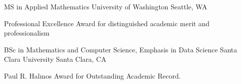 
\begin{cventries}

  \cventry
    {MS in Applied Mathematics} %
    {University of Washington} %
    {Seattle, WA} %
    {} %
    {
      \begin{cvitems} %
        \item {Professional Excellence Award for distinguished academic merit and professionalism}
      \end{cvitems}
    }

  \cventry
    {BSc in Mathematics and Computer Science, Emphasis in Data Science} %
    {Santa Clara University} %
    {Santa Clara, CA} %
    {} %
    {
      \begin{cvitems} %
        \item {Paul R. Halmos Award for Outstanding Academic Record.}
      \end{cvitems}
    }

\end{cventries}
